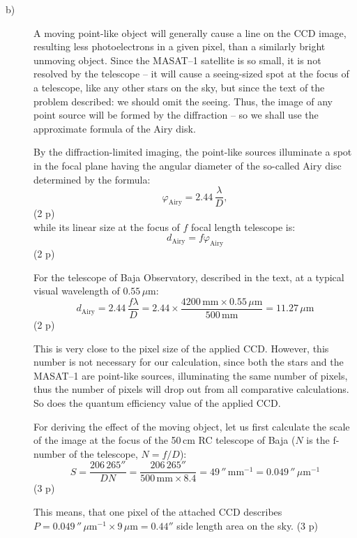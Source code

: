 \begin{description}
\item[b)] A moving point-like object will generally cause a line on the CCD
image, resulting less photoelectrons in a given pixel, than a similarly
bright unmoving object. Since the MASAT--1 satellite is so small, it is not
resolved by the telescope -- it will cause a seeing-sized spot at the focus
of a telescope, like any other stars on the sky, but since the text of the
problem described: we should omit the seeing. Thus, the image of any point
source will be formed by the diffraction -- so we shall use the approximate
formula of the Airy disk.

By the diffraction-limited imaging, the point-like sources illuminate a spot
in the focal plane having the angular diameter of the so-called Airy disc
determined by the formula:
\begin{equation*}
\varphi_{\mathrm{Airy}} = 2.44\,\frac{\lambda}{D}, \tag{14.4}
\end{equation*}
\hfill(2 p)\\
while its linear size at the focus of $f$ focal length telescope is:
\begin{equation*}
d_{\mathrm{Airy}} = f\varphi_{\mathrm{Airy}} \tag{14.5}
\end{equation*}
\hfill(2 p)

For the telescope of Baja Observatory, described in the text, at a typical
visual wavelength of $0.55\,\mu\mathrm{m}$:
\[ d_{\mathrm{Airy}} = 2.44\,\frac{f\lambda}{D}
   = 2.44 \times \frac{4200\,\mathrm{mm} \times 0.55\,\mu\mathrm{m}}
     {500\,\mathrm{mm}}
   = 11.27\,\mu\mathrm{m} \]
\hfill(2 p)

This is very close to the pixel size of the applied CCD. However, this
number is not necessary for our calculation, since both the stars and the
MASAT--1 are point-like sources, illuminating the same number of pixels, thus
the number of pixels will drop out from all comparative calculations. So
does the quantum efficiency value of the applied CCD.

For deriving the effect of the moving object, let us first calculate the
scale of the image at the focus of the 50\,cm RC telescope of Baja ($N$ is
the f-number of the telescope, $N = f/D$):
\[ S = \frac{206\,265''}{DN}
     = \frac{206\,265''}{500\,\mathrm{mm} \times 8.4}
     = 49\,''\,\mathrm{mm^{-1}} = 0.049\,''\,\mu\mathrm{m}^{-1} \]
\hfill(3 p)

This means, that one pixel of the attached CCD describes
$P = 0.049\,''\,\mu\mathrm{m}^{-1} \times 9\,\mu\mathrm{m} = 0.44''$
side length area on the sky. \hfill(3 p)


\end{description}
